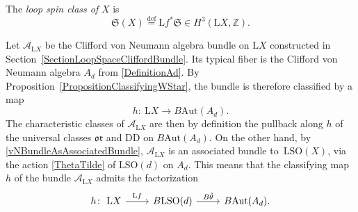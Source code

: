 \documentclass[11pt]{article}
\numberwithin{equation}{section}
\numberwithin{equation}{section}
\newcommand{\Z}{\mathbb{Z}}
\newcommand{\A}{\mathcal{A}}
\newcommand{\SO}{\mathrm{SO}}
\newcommand{\Aut}{\mathrm{Aut}}
\renewcommand{\L}{\mathrm{L}}
\newcommand{\DD}{\mathrm{DD}}
\newcommand{\defeq}{\stackrel{\mathrm{def}}{=}}
\newcommand{\oclass}{\mathfrak{or}}
\begin{document}
\begin{Definition}
The \emph{loop spin class of} $X$ is
\begin{equation*}
\mathfrak{S}(X) \defeq \L f^* \mathfrak{S} \in H^3(\L X, \Z).
\end{equation*}
\end{Definition}

Let $\A_{\L X}$ be the Clifford von Neumann algebra bundle on $\L X$ constructed in Section~\ref{SectionLoopSpaceCliffordBundle}.
Its typical fiber is the Clifford von Neumann algebra $A_d$ from \eqref{DefinitionAd}.
By Proposition~\ref{PropositionClassifyingWStar}, the bundle is therefore classified by a map
\begin{equation*}
h\colon\ \L X \longrightarrow B\Aut(A_d).
\end{equation*}
The characteristic classes of $\A_{\L X}$ are then by definition the pullback along $h$ of the universal classes $\oclass$ and $\DD$ on $B\Aut(A_d)$. On the other hand, by \eqref{vNBundleAsAssociatedBundle}, $\A_{\L X}$ is an associated bundle to~$\L\SO(X)$, via the action \eqref{ThetaTilde} of $\L\SO(d)$ on $A_d$.
This means that the classifying map $h$ of the bundle $\A_{\L X}$ admits the factorization
\begin{equation*}
\begin{tikzcd}
 h \colon\ \L X \ar[r, "\L f"] %
 & B \L \SO(d) \ar[r, "B\tilde{\theta}"] & B\Aut(A_d).
\end{tikzcd}
\end{equation*}
\end{document}
